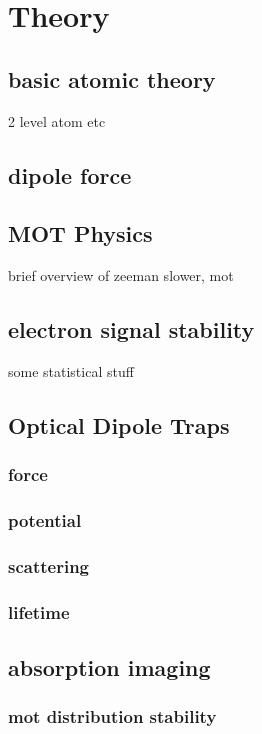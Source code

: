 \chapter{Theory}

\section{basic atomic theory}

2 level atom etc

\section{dipole force}

\section{MOT Physics}

brief overview of zeeman slower, mot

\section{electron signal stability}

some statistical stuff

\section{Optical Dipole Traps}

    \subsection{force}

    \subsection{potential}

    \subsection{scattering}

    \subsection{lifetime}


\section{absorption imaging}

    \subsection{mot distribution stability}

